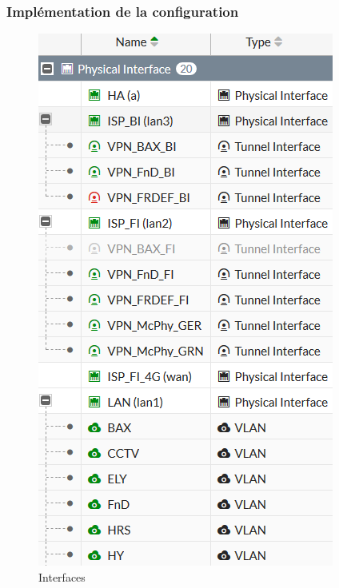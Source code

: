 \documentclass[french, a4paper]{beamer}
\begin{document}
\begin{frame}
    \frametitle{Implémentation de la configuration}
    \begin{minipage}{0.3\textwidth}
        \begin{figure}[h!]
            \centering
            \includegraphics[width = \linewidth]{img/fgt-auxr/interfaces.png}
            \caption{Interfaces}%
            \label{fig:fgt-auxr/interfaces}
        \end{figure}

\end{minipage}
\end{frame}
\end{document}
